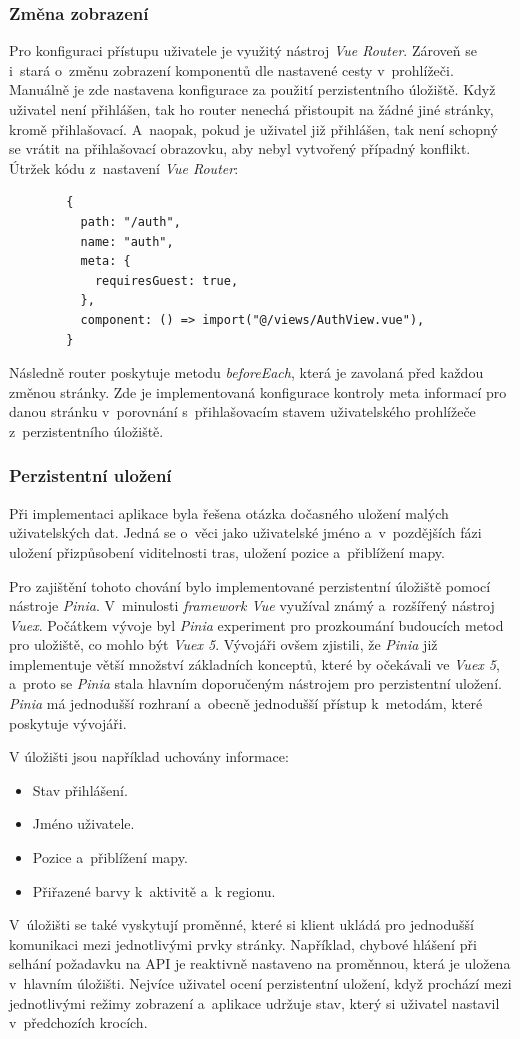 \subsubsection{Změna zobrazení}
Pro konfiguraci přístupu uživatele je využitý nástroj \emph{Vue Router}. Zároveň se i~stará o~změnu zobrazení komponentů dle nastavené cesty v~prohlížeči. Manuálně je zde nastavena konfigurace za použití perzistentního úložiště. Když uživatel není přihlášen, tak ho router nenechá přistoupit na žádné jiné stránky, kromě přihlašovací. A~naopak, pokud je uživatel již přihlášen, tak není schopný se vrátit na přihlašovací obrazovku, aby nebyl vytvořený případný konflikt.
Útržek kódu z~nastavení \emph{Vue Router}:
\begin{verbatim}
        {
          path: "/auth",
          name: "auth",
          meta: {
            requiresGuest: true,
          },
          component: () => import("@/views/AuthView.vue"),
        }
\end{verbatim}
Následně router poskytuje metodu \emph{beforeEach}, která je zavolaná před každou změnou stránky. Zde je implementovaná konfigurace kontroly meta informací pro danou stránku v~porovnání s~přihlašovacím stavem uživatelského prohlížeče z~perzistentního úložiště. 
\subsubsection{Perzistentní uložení}
Při implementaci aplikace byla řešena otázka dočasného uložení malých uživatelských dat. Jedná se o~věci jako uživatelské jméno a~v~pozdějších fázi uložení přizpůsobení viditelnosti tras, uložení pozice a~přiblížení mapy.

Pro zajištění tohoto chování bylo implementované perzistentní úložiště pomocí nástroje \emph{Pinia}. V~minulosti \emph{framework Vue} využíval známý a~rozšířený nástroj \emph{Vuex}. Počátkem vývoje byl \emph{Pinia} experiment pro prozkoumání budoucích metod pro uložiště, co mohlo být \emph{Vuex 5}. Vývojáři ovšem zjistili, že \emph{Pinia} již implementuje větší množství základních konceptů, které by očekávali ve \emph{Vuex 5}, a~proto se \emph{Pinia} stala hlavním doporučeným nástrojem pro perzistentní uložení. \emph{Pinia} má jednodušší rozhraní a~obecně jednodušší přístup k~metodám, které poskytuje vývojáři. \cite{pinia}

V úložišti jsou například uchovány informace:
\begin{itemize}
    \item Stav přihlášení.
    \item Jméno uživatele.
    \item Pozice a~přiblížení mapy.
    \item Přiřazené barvy k~aktivitě a~k regionu.
\end{itemize}
V~úložišti se také vyskytují proměnné, které si klient ukládá pro jednodušší komunikaci mezi jednotlivými prvky stránky. Například, chybové hlášení při selhání požadavku na API je reaktivně nastaveno na proměnnou, která je uložena v~hlavním úložišti. Nejvíce uživatel ocení perzistentní uložení, když prochází mezi jednotlivými režimy zobrazení a~aplikace udržuje stav, který si uživatel nastavil v~předchozích krocích.

